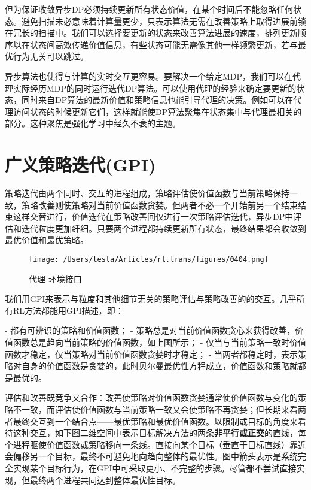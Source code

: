 \documentclass{ctexart}
\begin{document}
但为保证收敛异步DP必须持续更新所有状态价值，在某个时间后不能忽略任何状态。避免扫描未必意味着计算量更少，只表示算法无需在改善策略上取得进展前锁在冗长的扫描中。我们可以选择要更新的状态来改善算法进展的速度，排列更新顺序以在状态间高效传递价值信息，有些状态可能无需像其他一样频繁更新，若与最优行为无关可以跳过。

异步算法也使得与计算的实时交互更容易。要解决一个给定MDP，我们可以在代理实际经历MDP的同时运行迭代DP算法。可以使用代理的经验来确定要更新的状态，同时来自DP算法的最新价值和策略信息也能引导代理的决策。例如可以在代理访问状态的时候更新它们，这样就能使DP算法聚焦在状态集中与代理最相关的部分。这种聚焦是强化学习中经久不衰的主题。



\section{广义策略迭代(GPI)}

策略迭代由两个同时、交互的进程组成，策略评估使价值函数与当前策略保持一致，策略改善则使策略对当前价值函数贪婪。但两者不必一个开始前另一个结束结束这样交替进行，价值迭代在策略改善间仅进行一次策略评估迭代，异步DP中评估和迭代粒度更加纤细。只要两个进程都持续更新所有状态，最终结果都会收敛到最优价值和最优策略。

\begin{figure}[htbp]
    \centering
    \texttt{[image: /Users/tesla/Articles/rl.trans/figures/0404.png]}
    \caption{代理-环境接口}
    \label{fig:0404} 
\end{figure}

我们用GPI来表示与粒度和其他细节无关的策略评估与策略改善的的交互。几乎所有RL方法都能用GPI描述，即：

- 都有可辨识的策略和价值函数；
- 策略总是对当前价值函数贪心来获得改善，价值函数总是趋向当前策略的价值函数，如上图所示；
- 仅当与当前策略一致时价值函数才稳定，仅当策略对当前价值函数贪婪时才稳定；
- 当两者都稳定时，表示策略对自身的价值函数是贪婪的，此时贝尔曼最优性方程成立，价值函数和策略就都是最优的。

评估和改善既竞争又合作：改善使策略对价值函数贪婪通常使价值函数与变化的策略不一致，而评估使价值函数与当前策略一致又会使策略不再贪婪；但长期来看两者最终交互到一个结合点——最优策略和最优价值函数。以限制或目标的角度来看待这种交互，如下图二维空间中表示目标解决方法的两条\textbf{非平行或正交}的直线，每个进程驱使价值函数或策略移向一条线。直接向某个目标（垂直于目标直线）靠近会偏移另一个目标，最终不可避免地向趋向整体的最优性。图中箭头表示是系统完全实现某个目标行为，在GPI中可采取更小、不完整的步骤。尽管都不尝试直接实现，但最终两个进程共同达到整体最优性目标。
\end{document}

